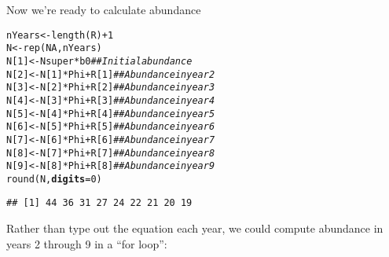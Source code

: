 \documentclass[12pt]{article}\usepackage[]{graphicx}\usepackage[]{color}
\makeatletter
\newcommand{\hlnum}[1]{\textcolor[rgb]{0.69,0.494,0}{#1}}%
\newcommand{\hlcom}[1]{\textcolor[rgb]{0.514,0.506,0.514}{\textit{#1}}}%
\newcommand{\hlopt}[1]{\textcolor[rgb]{0,0,0}{#1}}%
\newcommand{\hlstd}[1]{\textcolor[rgb]{0,0,0}{#1}}%
\newcommand{\hlkwb}[1]{\textcolor[rgb]{0,0.341,0.682}{#1}}%
\newcommand{\hlkwc}[1]{\textcolor[rgb]{0,0,0}{\textbf{#1}}}%
\newcommand{\hlkwd}[1]{\textcolor[rgb]{0.004,0.004,0.506}{#1}}%
\newenvironment{kframe}{%
 \def\at@end@of@kframe{}%
 \ifinner\ifhmode%
  \def\at@end@of@kframe{\end{minipage}}%
  \begin{minipage}{\columnwidth}%
 \fi\fi%
 \def\FrameCommand##1{\hskip\@totalleftmargin \hskip-\fboxsep
 \colorbox{shadecolor}{##1}\hskip-\fboxsep
     \hskip-\linewidth \hskip-\@totalleftmargin \hskip\columnwidth}%
 \MakeFramed {\advance\hsize-\width
   \@totalleftmargin\z@ \linewidth\hsize
   \@setminipage}}%
 {\par\unskip\endMakeFramed%
 \at@end@of@kframe}
\newenvironment{knitrout}{}{} %
\makeatother
\begin{document}
Now we're ready to calculate abundance

\begin{knitrout}
\color{fgcolor}\begin{kframe}
\begin{alltt}
\hlstd{nYears} \hlkwb{<-} \hlkwd{length}\hlstd{(R)}\hlopt{+}\hlnum{1}
\hlstd{N} \hlkwb{<-} \hlkwd{rep}\hlstd{(}\hlnum{NA}\hlstd{, nYears)}
\hlstd{N[}\hlnum{1}\hlstd{]} \hlkwb{<-} \hlstd{Nsuper}\hlopt{*}\hlstd{b0}            \hlcom{## Initial abundance}
\hlstd{N[}\hlnum{2}\hlstd{]} \hlkwb{<-} \hlstd{N[}\hlnum{1}\hlstd{]}\hlopt{*}\hlstd{Phi} \hlopt{+} \hlstd{R[}\hlnum{1}\hlstd{]}      \hlcom{## Abundance in year 2}
\hlstd{N[}\hlnum{3}\hlstd{]} \hlkwb{<-} \hlstd{N[}\hlnum{2}\hlstd{]}\hlopt{*}\hlstd{Phi} \hlopt{+} \hlstd{R[}\hlnum{2}\hlstd{]}      \hlcom{## Abundance in year 3}
\hlstd{N[}\hlnum{4}\hlstd{]} \hlkwb{<-} \hlstd{N[}\hlnum{3}\hlstd{]}\hlopt{*}\hlstd{Phi} \hlopt{+} \hlstd{R[}\hlnum{3}\hlstd{]}      \hlcom{## Abundance in year 4}
\hlstd{N[}\hlnum{5}\hlstd{]} \hlkwb{<-} \hlstd{N[}\hlnum{4}\hlstd{]}\hlopt{*}\hlstd{Phi} \hlopt{+} \hlstd{R[}\hlnum{4}\hlstd{]}      \hlcom{## Abundance in year 5}
\hlstd{N[}\hlnum{6}\hlstd{]} \hlkwb{<-} \hlstd{N[}\hlnum{5}\hlstd{]}\hlopt{*}\hlstd{Phi} \hlopt{+} \hlstd{R[}\hlnum{5}\hlstd{]}      \hlcom{## Abundance in year 6}
\hlstd{N[}\hlnum{7}\hlstd{]} \hlkwb{<-} \hlstd{N[}\hlnum{6}\hlstd{]}\hlopt{*}\hlstd{Phi} \hlopt{+} \hlstd{R[}\hlnum{6}\hlstd{]}      \hlcom{## Abundance in year 7}
\hlstd{N[}\hlnum{8}\hlstd{]} \hlkwb{<-} \hlstd{N[}\hlnum{7}\hlstd{]}\hlopt{*}\hlstd{Phi} \hlopt{+} \hlstd{R[}\hlnum{7}\hlstd{]}      \hlcom{## Abundance in year 8}
\hlstd{N[}\hlnum{9}\hlstd{]} \hlkwb{<-} \hlstd{N[}\hlnum{8}\hlstd{]}\hlopt{*}\hlstd{Phi} \hlopt{+} \hlstd{R[}\hlnum{8}\hlstd{]}      \hlcom{## Abundance in year 9}
\hlkwd{round}\hlstd{(N,} \hlkwc{digits}\hlstd{=}\hlnum{0}\hlstd{)}
\end{alltt}
\begin{verbatim}
## [1] 44 36 31 27 24 22 21 20 19
\end{verbatim}
\end{kframe}
\end{knitrout}

\clearpage

Rather than type out the equation each year, we could compute
abundance in years 2 through 9 in a ``for loop'':
\end{document}
